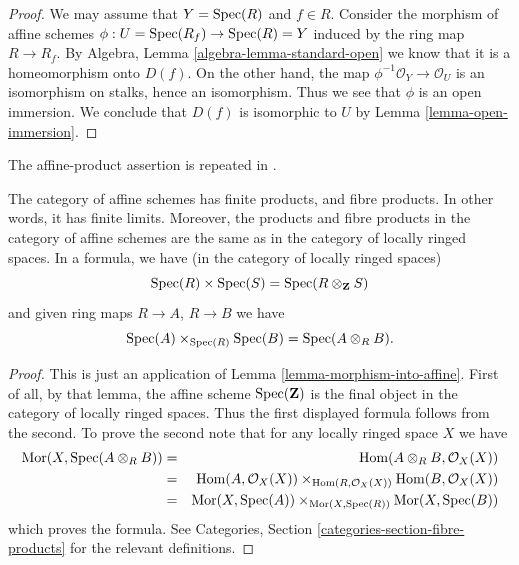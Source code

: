 \begin{proof}
We may assume that $Y = \mathop{\mathrm{Spec}}(R)$ and $f \in R$.
Consider the morphism of affine schemes
$\phi : U = \mathop{\mathrm{Spec}}(R_f) \to \mathop{\mathrm{Spec}}(R) = Y$ induced by the ring
map $R \to R_f$. By Algebra, Lemma \ref{algebra-lemma-standard-open}
we know that it is a homeomorphism onto $D(f)$.
On the other hand, the map $\phi^{-1}\mathcal{O}_Y \to \mathcal{O}_U$
is an isomorphism on stalks, hence an isomorphism. Thus we see
that $\phi$ is an open immersion. We conclude that $D(f)$
is isomorphic to $U$ by Lemma \ref{lemma-open-immersion}.
\end{proof}

\begin{lemma}
\label{lemma-fibre-product-affine-schemes}
\begin{reference}
\cite[Chapter II, \S 1, no. 33, pp. 225--226]{FAC}
The affine-product assertion is repeated in
\cite[Chapter II, \S 3, no. 42, pp. 233--234]{FAC}.
\end{reference}
The category of affine schemes has finite products, and fibre products.
In other words, it has finite limits. Moreover, the products
and fibre products in the category of affine schemes
are the same as in the category of locally ringed spaces.
In a formula, we have (in the category of locally ringed spaces)
$$
\mathop{\mathrm{Spec}}(R) \times \mathop{\mathrm{Spec}}(S) =
\mathop{\mathrm{Spec}}(R \otimes_{\mathbf{Z}} S)
$$
and given ring maps $R \to A$, $R \to B$ we have
$$
\mathop{\mathrm{Spec}}(A) \times_{\mathop{\mathrm{Spec}}(R)} \mathop{\mathrm{Spec}}(B)
=
\mathop{\mathrm{Spec}}(A \otimes_R B).
$$
\end{lemma}

\begin{proof}
This is just an application of Lemma \ref{lemma-morphism-into-affine}.
First of all, by that lemma, the affine scheme
$\mathop{\mathrm{Spec}}(\mathbf{Z})$ is the final object in the category
of locally ringed spaces. Thus the first displayed formula
follows from the second. To prove the second note that
for any locally ringed space $X$ we have
\begin{eqnarray*}
\mathop{\mathrm{Mor}}\nolimits(X, \mathop{\mathrm{Spec}}(A \otimes_R B))
& = &
\mathop{\mathrm{Hom}}\nolimits(A \otimes_R B, \mathcal{O}_X(X)) \\
& = &
\mathop{\mathrm{Hom}}\nolimits(A, \mathcal{O}_X(X))
\times_{\mathop{\mathrm{Hom}}\nolimits(R, \mathcal{O}_X(X))}
\mathop{\mathrm{Hom}}\nolimits(B, \mathcal{O}_X(X)) \\
& = &
\mathop{\mathrm{Mor}}\nolimits(X, \mathop{\mathrm{Spec}}(A))
\times_{\mathop{\mathrm{Mor}}\nolimits(X, \mathop{\mathrm{Spec}}(R))}
\mathop{\mathrm{Mor}}\nolimits(X, \mathop{\mathrm{Spec}}(B))
\end{eqnarray*}
which proves the formula.
See Categories, Section \ref{categories-section-fibre-products} for the
relevant definitions.
\end{proof}

